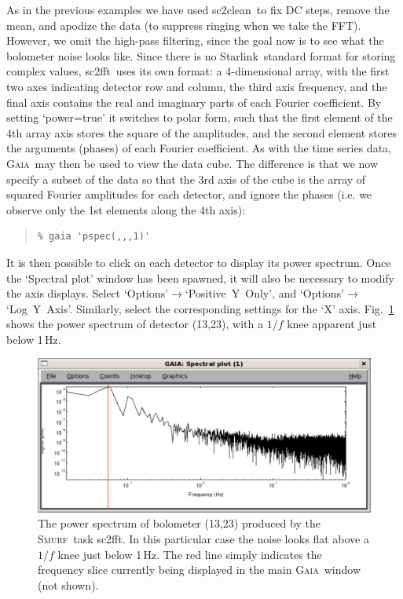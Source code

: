 \documentclass[twoside,11pt]{article}
\newcommand{\htmladdnormallink}[2]{#1}
\newcommand{\xref}[3]{#1}
\renewcommand{\_}{\texttt{\symbol{95}}}
\newenvironment{myquote}{\begin{quote}\begin{small}}{\end{small}\end{quote}}
\newcommand{\starlink}{\htmladdnormallink{Starlink}{http://starlink.jach.hawaii.edu}}
\newcommand{\gaia}{\xref{\textsc{Gaia}}{sun214}{}}
\newcommand{\smurf}{\xref{\textsc{Smurf}}{sun258}{}}
\newcommand{\task}[1]{\textsf{#1}}
\newcommand{\fft}{\xref{\task{sc2fft}}{sun258}{SC2FFT}}
\newcommand{\clean}{\xref{\task{sc2clean}}{sun258}{SC2CLEAN}}
\begin{document}
As in the previous examples we have used \clean\ to fix DC steps,
remove the mean, and apodize the data (to suppress ringing when we
take the FFT). However, we omit the high-pass filtering, since the
goal now is to see what the bolometer noise looks like. Since there is
no \starlink\ standard format for storing complex values, \fft\ uses
its own format: a 4-dimensional array, with the first two axes
indicating detector row and column, the third axis frequency, and the
final axis contains the real and imaginary parts of each Fourier
coefficient. By setting `power=true' it switches to polar form, such
that the first element of the 4th array axis stores the square of the
amplitudes, and the second element stores the arguments (phases) of
each Fourier coefficient. As with the time series data, \gaia\ may
then be used to view the data cube. The difference is that we now
specify a subset of the data so that the 3rd axis of the cube is the
array of squared Fourier amplitudes for each detector, and ignore the
phases (i.e. we observe only the 1st elements along the 4th axis):

\begin{myquote}
\begin{verbatim}
% gaia 'pspec(,,,1)'
\end{verbatim}
\end{myquote}

It is then possible to click on each detector to display its power
spectrum. Once the `Spectral plot' window has been spawned, it will
also be necessary to modify the axis displays. Select
`Options'$\rightarrow$`Positive~Y~Only', and
`Options'$\rightarrow$`Log~Y~Axis'. Similarly, select the
corresponding settings for the `X' axis. Fig.~\ref{fig:pspec} shows
the power spectrum of detector (13,23), with a $1/f$ knee apparent
just below 1\,Hz.

\begin{figure}
\begin{center}
\includegraphics[width=\linewidth]{sc19_pspec}
\caption{The power spectrum of bolometer (13,23) produced by the
  \smurf\ task \fft. In this particular case the noise looks flat
  above a $1/f$ knee just below 1\,Hz. The red line simply indicates
  the frequency slice currently being displayed in the main \gaia\
  window (not shown).}
\label{fig:pspec}
\end{center}
\end{figure}
\end{document}
